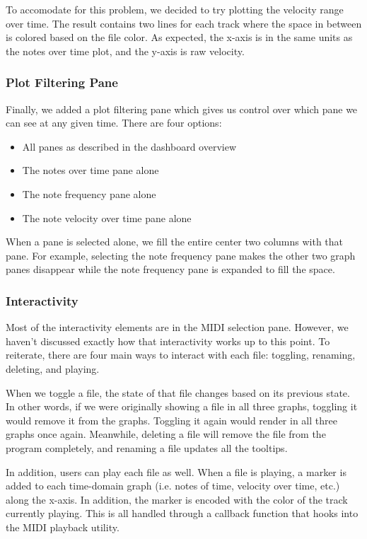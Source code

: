 \documentclass[journal]{vgtc}                %
\begin{document}
To accomodate for this problem, we decided to try plotting the velocity range
over time. The result contains two lines for each track where the space in
between is colored based on the file color. As expected, the x-axis is in the
same units as the notes over time plot, and the y-axis is raw velocity.

\subsubsection{Plot Filtering Pane}

Finally, we added a plot filtering pane which gives us control over which pane
we can see at any given time. There are four options:

\begin{itemize}
  \item All panes as described in the dashboard overview
  \item The notes over time pane alone
  \item The note frequency pane alone
  \item The note velocity over time pane alone
\end{itemize}

When a pane is selected alone, we fill the entire center two columns with that
pane. For example, selecting the note frequency pane makes the other two graph
panes disappear while the note frequency pane is expanded to fill the space.

\subsubsection{Interactivity}

Most of the interactivity elements are in the MIDI selection pane. However, we
haven't discussed exactly how that interactivity works up to this point. To
reiterate, there are four main ways to interact with each file: toggling,
renaming, deleting, and playing.

When we toggle a file, the state of that file changes based on its previous
state. In other words, if we were originally showing a file in all three graphs,
toggling it would remove it from the graphs. Toggling it again would render in
all three graphs once again. Meanwhile, deleting a file will remove the file
from the program completely, and renaming a file updates all the tooltips.

In addition, users can play each file as well. When a file is playing, a marker
is added to each time-domain graph (i.e. notes of time, velocity over time, etc.)
along the x-axis. In addition, the marker is encoded with the color of the
track currently playing. This is all handled through a callback function that
hooks into the MIDI playback utility.
\end{document}
